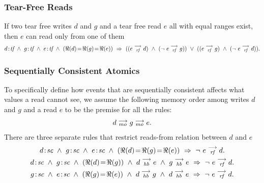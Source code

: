       \subsubsection{Tear-Free Reads} 
               If two tear free writes $d$ and $g$ and a tear free read $e$ all with equal ranges exist, then $e$ can read only from one of them
                \begin{align*}
                      \et{d}{tf}\ \wedge\ \et{g}{tf} \ \wedge \ \et{e}{tf} 
                        \ \wedge \ 
                        (\Re(d) \!=\! \Re(g) \!=\! \Re(e)) 
                        \ \Rightarrow{} \ 
                            ((\reln{e}{rf}{d}) 
                            \ \wedge \ 
                            (\neg \ \reln{e}{rf}{g})) 
                        \ \vee \  
                            ((\reln{e}{rf}{g}) 
                            \ \wedge \
                            (\neg \ \reln{e}{rf}{d})).
                \end{align*}
                    
        \subsubsection{Sequentially Consistent Atomics} 
            To specifically define how events that are sequentially consistent affects what values a read cannot see, we assume the following memory order among writes $d$ and $g$ and a read $e$ to be the premise for all the rules: 
                \begin{align*}
                    d \stackrel{\longrightarrow}{_{mo}} g \stackrel{\longrightarrow}{_{mo}} e.
                \end{align*}
            There are three separate rules that restrict reads-from relation between $d$ and $e$
                \begin{gather*}
                        \et{d}{sc}\ \wedge\ \et{g}{sc}\ \wedge\ \et{e}{sc} 
                        \ \wedge \ (\Re(d) \!=\! \Re(g) \!=\! \Re(e))
                        \ \Rightarrow{} \ 
                        \neg \ \reln{e}{rf}{d}.
                    \\    
                        \et{d}{sc}\ \wedge\ \et{g}{sc}  
                        \ \wedge \ (\Re(d) \!=\! \Re(g)) 
                        \ \wedge \ \reln{d}{hb}{e}
                        \ \wedge \ \reln{g}{hb}{e}
                        \ \Rightarrow{}\  
                        \neg \ \reln{e}{rf}{d}.
                    \\
                        \et{g}{sc}\ \wedge\ \et{e}{sc}  
                        \ \wedge \ (\Re(g) \!= \!\Re(e)) 
                        \ \wedge \ \reln{d}{hb}{g} 
                        \ \wedge \ \reln{d}{hb}{e}
                        \ \Rightarrow \ 
                        \neg \ \reln{e}{rf}{d}.
                \end{gather*}
  